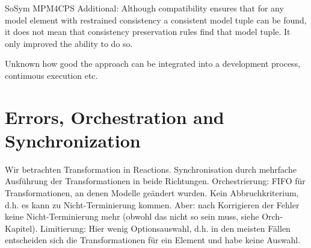 \begin{copiedFrom}{SoSym MPM4CPS}
Additional:
Although compatibility ensures that for any model element with restrained consistency a consistent model tuple can be found, it does not mean that consistency preservation rules find that model tuple. It only improved the ability to do so.

Unknown how good the approach can be integrated into a development process, continuous execution etc.

    

\end{copiedFrom} %




\section{Errors, Orchestration and Synchronization}


Wir betrachten Transformation in Reactions.
Synchronisation durch mehrfache Ausführung der Transformationen in beide Richtungen.
Orchestrierung: FIFO für Transformationen, an denen Modelle geändert wurden. Kein Abbruchkriterium, d.h. es kann zu Nicht-Terminierung kommen. Aber: nach Korrigieren der Fehler keine Nicht-Terminierung mehr (obwohl das nicht so sein muss, siehe Orch-Kapitel). Limitierung: Hier wenig Optionsauswahl, d.h. in den meisten Fällen entscheiden sich die Transformationen für ein Element und habe keine Auswahl.


